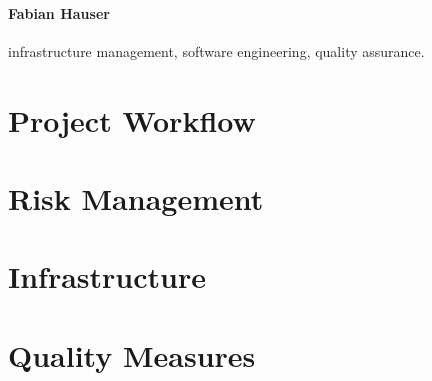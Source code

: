 \documentclass[a4paper]{article}
\begin{document}
\paragraph{Fabian Hauser} infrastructure management, software engineering, quality assurance.



\section{Project Workflow}


\section{Risk Management}

\section{Infrastructure}

\section{Quality Measures}



\end{document}
